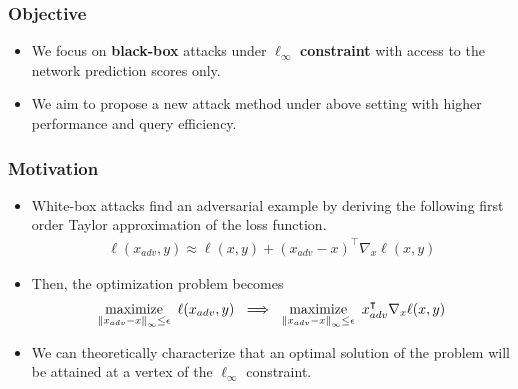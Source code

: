 \documentclass[10pt,mathserif]{beamer}
\newcommand{\norm}[1]{\left\lVert#1\right\rVert}
\begin{document}

\begin{frame}
    \frametitle{Objective}
    \begin{itemize}\itemsep=20pt
        \item We focus on \textbf{black-box} attacks under $\boldsymbol\ell_{\boldsymbol\infty}$ \textbf{constraint} with access to the network prediction scores only.\pause
        \item We aim to propose a new attack method under above setting with higher performance and query efficiency.
    \end{itemize}
    
\end{frame}


\begin{frame}
\frametitle{Motivation}
\begin{itemize}\itemsep=12pt
    \item White-box attacks find an adversarial example by deriving the following first order Taylor approximation of the loss function.
    \begin{align*}
        \ell(x_{adv}, y) \approx \ell(x, y) + (x_{adv}-x)^\intercal \nabla_{x}\ell(x, y)
    \end{align*}\pause
    \item Then, the optimization problem becomes
    \begin{align*}
        \maximize_{\norm{x_{adv}-x}_\infty \le \epsilon}~\ell(x_{adv}, y) ~\implies~ \maximize_{\norm{x_{adv}-x}_\infty \le \epsilon}~x_{adv}^\intercal \nabla_{x}\ell(x, y)
    \end{align*}\pause
    \item We can theoretically characterize that an optimal solution of the problem will be attained at a vertex of the $\ell_\infty$ constraint. 
\end{itemize}
\end{frame}
\end{document}
